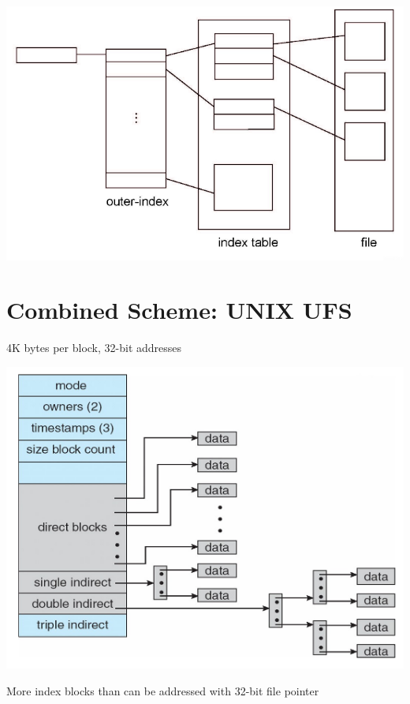 \documentclass{article}[18pt]
\begin{document}
\begin{center}
	\includegraphics[scale=0.7]{index5}
\end{center}
\section{Combined Scheme: UNIX UFS}
4K bytes per block, 32-bit addresses
\begin{center}
	\includegraphics[scale=0.7]{UFS}
\end{center}
More index blocks than can be addressed with 32-bit file pointer
\end{document}

